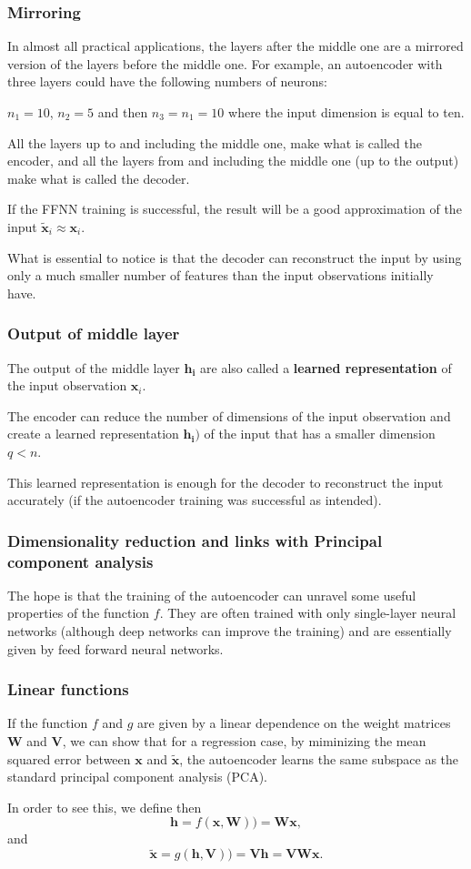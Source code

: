 \documentclass{beamer}
\begin{document}
\begin{frame}
\frametitle{Mirroring}

In almost all practical applications,
the layers after the middle one are a mirrored version of the layers before the middle one.
For example, an autoencoder with three layers could have the following numbers of neurons:

$n_{1} = 10$, $n_{2} = 5$ and then $n_{3} = n_{1} = 10$ where the input dimension is equal to ten.

All the layers up to and including the middle one, make what is called the encoder, and all the layers from and including
the middle one (up to the output) make what is called the decoder.

If the FFNN training is successful, the result will
be a good approximation of the input $\tilde{\mathbf{x}}_{i}\approx\mathbf{x}_{i}$.

What is essential to notice is that the decoder can reconstruct the
input by using only a much smaller number of features than the input
observations initially have.
\end{frame}

\begin{frame}
\frametitle{Output of middle layer}

The output of the middle layer
$\mathbf{h}_{\mathbf{i}}$ are also called a \textbf{learned representation} of the input observation $\mathbf{x}_{i}$.

The encoder can reduce the number of dimensions of the input
observation and create a learned representation
$\mathbf{h}_{\mathbf{i}}\mathbf{) }$ of the input that has a smaller
dimension $q<n$.

This learned representation is enough for the decoder to reconstruct
the input accurately (if the autoencoder training was successful as
intended).
\end{frame}

\begin{frame}
\frametitle{Dimensionality reduction and links with Principal component analysis}

The hope is that the training of the autoencoder can unravel some
useful properties of the function $f$. They are often trained with
only single-layer neural networks (although deep networks can improve
the training) and are essentially given by feed forward neural
networks.
\end{frame}

\begin{frame}
\frametitle{Linear functions}

If the function $f$ and $g$ are given by a linear dependence on the
weight matrices $\bm{W}$ and $\bm{V}$, we can show that for a
regression case, by miminizing the mean squared error between $\bm{x}$
and $\tilde{\bm{x}}$, the autoencoder learns the same subspace as the
standard principal component analysis (PCA).

In order to see this, we define then
\[
\bm{h} = f(\bm{x},\bm{W}))=\bm{W}\bm{x},
\]
and
\[
\tilde{\bm{x}} = g(\bm{h},\bm{V}))=\bm{V}\bm{h}=\bm{V}\bm{W}\bm{x}.
\]
\end{frame}
\end{document}

